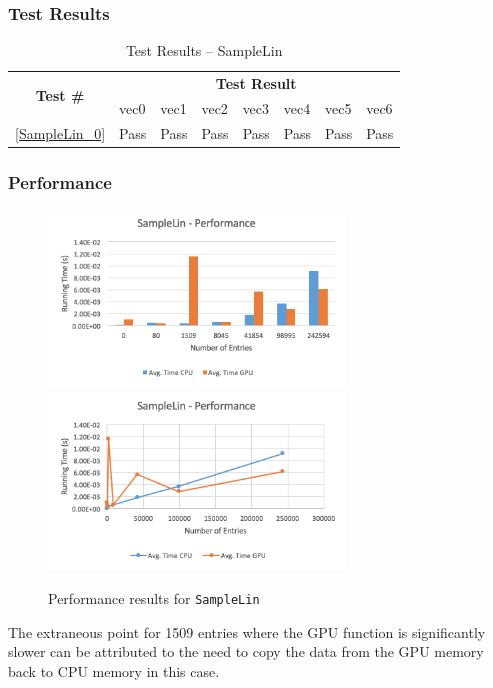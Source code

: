 \documentclass[12pt]{article}
\begin{document}
	\subsubsection{Test Results}
		\begin{table}[H]
		\centering
		\caption{Test Results -- SampleLin}\label{SampleLin_acc}
		\begin{tabular}{clllllll}
		\toprule
		\multirow{2}{*}{\bf Test \#} & \multicolumn{7}{c}{\bf Test Result}\\
		& vec0 & vec1 & vec2 & vec3 & vec4 & vec5 & vec6\\\midrule
		\ref{SampleLin_0} & Pass & Pass & Pass & Pass & Pass & Pass & Pass\\
		\bottomrule
		\end{tabular}
		\end{table}

	\subsubsection{Performance}
		\begin{figure}[H]
    	\centering
    	\caption{Performance results for \texttt{SampleLin}}\label{figPerformanceSampleLin}
    	\includegraphics[width=0.7\textwidth]{samplelin_bar.png}
    	\includegraphics[width=0.7\textwidth]{samplelin_line.png}
    	\end{figure}
	The extraneous point for 1509 entries where the GPU function is significantly slower can be attributed to the need to copy the data from the GPU memory back to CPU memory in this case.
\end{document}
